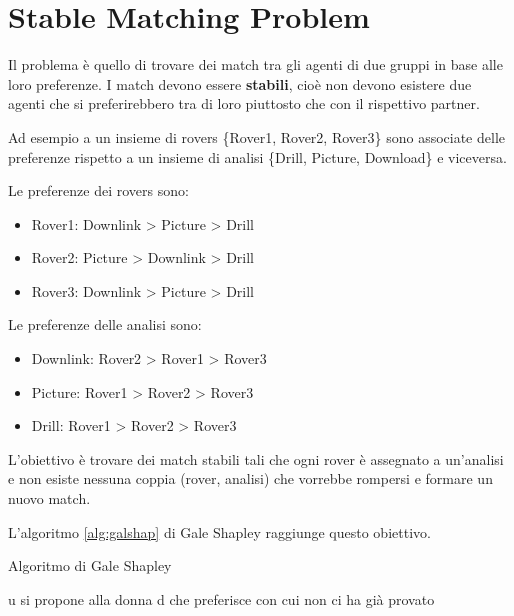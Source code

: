 \newpage

\section{Stable Matching Problem}


Il problema è quello di trovare dei match tra gli agenti di due gruppi
in base alle loro preferenze. I match devono essere \textbf{stabili}, cioè
non devono esistere due agenti che si preferirebbero tra di loro piuttosto
che con il rispettivo partner.

Ad esempio a un insieme di rovers \{Rover1, Rover2, Rover3\} sono associate
delle preferenze rispetto a un insieme di analisi \{Drill, Picture, Download\}
e viceversa.

Le preferenze dei rovers sono:

\begin{itemize}
 \item Rover1:  Downlink > Picture > Drill
 \item Rover2:  Picture > Downlink > Drill
 \item Rover3:  Downlink > Picture > Drill
\end{itemize}

Le preferenze delle analisi sono:

\begin{itemize}
 \item Downlink: Rover2 > Rover1 > Rover3
 \item Picture: Rover1 > Rover2 > Rover3
 \item Drill: Rover1 > Rover2 > Rover3
\end{itemize}

L'obiettivo è trovare dei match stabili tali che ogni rover è assegnato a
un'analisi e non esiste nessuna coppia (rover, analisi) che vorrebbe rompersi
e formare un nuovo match.

L'algoritmo \ref{alg:galshap} di Gale Shapley raggiunge questo obiettivo.

\begin{algorithm}
    \caption{Algoritmo di Gale Shapley}
    \label{alg:galshap}
    \begin{algorithmic}[1] %
            \State u si propone alla donna d che preferisce con cui non ci
ha già provato
             
            \Else
             
            \Else {} \EndIf
            \EndIf
            \EndWhile
        \EndProcedure
    \end{algorithmic}
\end{algorithm}

